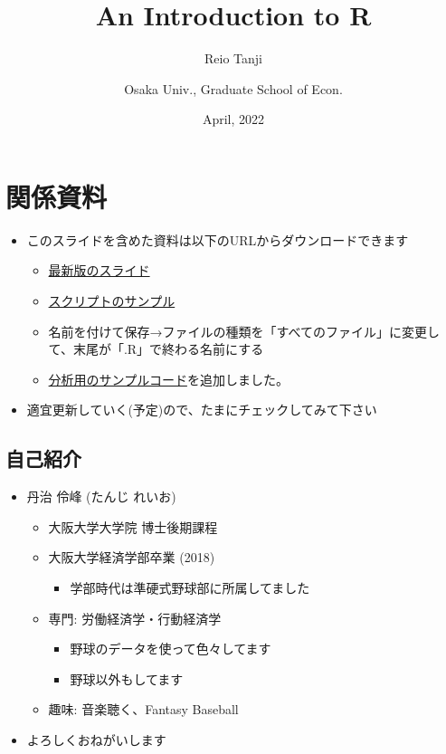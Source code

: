 \documentclass[
]{ltjsarticle}
\title{An Introduction to R}
\author{Reio Tanji \and Osaka Univ., Graduate School of Econ.}
\date{April, 2022}
\providecommand{\tightlist}{%
  \setlength{\itemsep}{0pt}\setlength{\parskip}{0pt}}
\begin{document}
\maketitle

\hypertarget{ux95a2ux4fc2ux8cc7ux6599}{%
\section{関係資料}\label{ux95a2ux4fc2ux8cc7ux6599}}

\begin{itemize}
\tightlist
\item
  このスライドを含めた資料は以下のURLからダウンロードできます

  \begin{itemize}
  \tightlist
  \item
    \href{https://github.com/T-Reio/r_introduction/blob/main/introduction1.pdf}{最新版のスライド}
  \item
    \href{https://raw.githubusercontent.com/T-Reio/r_introduction/main/script/script_sample.R}{スクリプトのサンプル}
  \item
    名前を付けて保存→ファイルの種類を「すべてのファイル」に変更して、末尾が「.R」で終わる名前にする
  \item
    \href{https://github.com/T-Reio/r_introduction/blob/main/script/analysis_sample.R}{分析用のサンプルコード}を追加しました。
  \end{itemize}
\item
  適宜更新していく(予定)ので、たまにチェックしてみて下さい
\end{itemize}

\hypertarget{ux81eaux5df1ux7d39ux4ecb}{%
\subsection{自己紹介}\label{ux81eaux5df1ux7d39ux4ecb}}

\begin{itemize}
\tightlist
\item
  丹治 伶峰 (たんじ れいお)

  \begin{itemize}
  \tightlist
  \item
    大阪大学大学院 博士後期課程
  \item
    大阪大学経済学部卒業 (2018)

    \begin{itemize}
    \tightlist
    \item
      学部時代は準硬式野球部に所属してました
    \end{itemize}
  \item
    専門: 労働経済学・行動経済学

    \begin{itemize}
    \tightlist
    \item
      野球のデータを使って色々してます
    \item
      野球以外もしてます
    \end{itemize}
  \item
    趣味: 音楽聴く、Fantasy Baseball
  \end{itemize}
\item
  よろしくおねがいします
\end{itemize}
\end{document}
